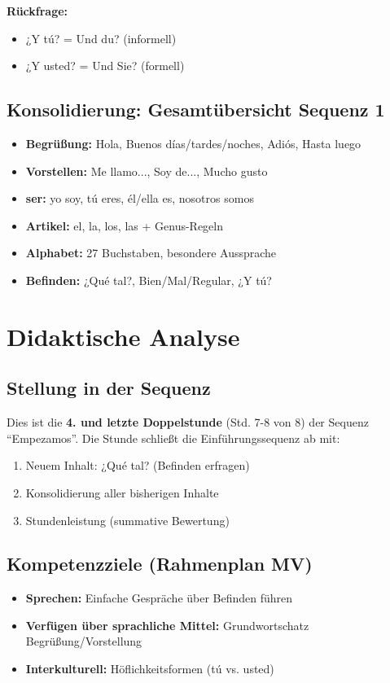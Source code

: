 \documentclass[11pt,a4paper]{article}
\newcommand{\reihenthema}{Empezamos}
\begin{document}
\textbf{Rückfrage:}
\begin{itemize}
    \item ¿Y tú? = Und du? (informell)
    \item ¿Y usted? = Und Sie? (formell)
\end{itemize}

\subsection{Konsolidierung: Gesamtübersicht Sequenz 1}
\begin{itemize}
    \item \textbf{Begrüßung:} Hola, Buenos días/tardes/noches, Adiós, Hasta luego
    \item \textbf{Vorstellen:} Me llamo..., Soy de..., Mucho gusto
    \item \textbf{ser:} yo soy, tú eres, él/ella es, nosotros somos
    \item \textbf{Artikel:} el, la, los, las + Genus-Regeln
    \item \textbf{Alphabet:} 27 Buchstaben, besondere Aussprache
    \item \textbf{Befinden:} ¿Qué tal?, Bien/Mal/Regular, ¿Y tú?
\end{itemize}

\section{Didaktische Analyse}

\subsection{Stellung in der Sequenz}
Dies ist die \textbf{4. und letzte Doppelstunde} (Std. 7-8 von 8) der Sequenz ``\reihenthema''.
Die Stunde schließt die Einführungssequenz ab mit:
\begin{enumerate}
    \item Neuem Inhalt: ¿Qué tal? (Befinden erfragen)
    \item Konsolidierung aller bisherigen Inhalte
    \item Stundenleistung (summative Bewertung)
\end{enumerate}

\subsection{Kompetenzziele (Rahmenplan MV)}
\begin{itemize}
    \item \textbf{Sprechen:} Einfache Gespräche über Befinden führen
    \item \textbf{Verfügen über sprachliche Mittel:} Grundwortschatz Begrüßung/Vorstellung
    \item \textbf{Interkulturell:} Höflichkeitsformen (tú vs. usted)
\end{itemize}
\end{document}

